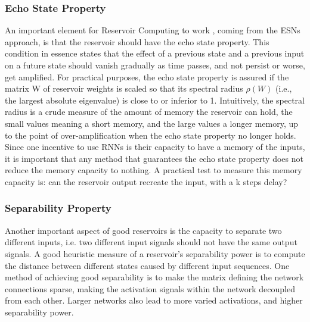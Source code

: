 \documentclass[12pt,oneside]{CUNY_CS_PhD}
\begin{document}
\subsubsection{Echo State Property}
An important element for Reservoir Computing to work , coming from the ESNs approach, is that the reservoir should have the echo state property. This condition in essence states that the effect of a previous state and a previous input on a future state should vanish gradually as time passes, and not persist or worse, get amplified. For practical purposes, the echo state property is assured if the matrix W of reservoir weights is scaled so that its spectral radius $\rho(W)$ (i.e., the largest absolute eigenvalue) is close to or inferior to 1. Intuitively, the spectral radius is a crude measure of the amount of memory the reservoir can hold, the small values meaning a short memory, and the large values a longer memory, up to the point of over-amplification when the echo state property no longer holds. Since one incentive to use RNNs is their capacity to have a memory of the inputs, it is important that any method that guarantees the echo state property does not reduce the memory capacity to nothing. A practical test to measure this memory capacity is: can the reservoir output recreate the input, with a k steps delay? 

\subsubsection{Separability Property}
Another important aspect of good reservoirs is the capacity to separate two different inputs, i.e. two different input signals should not have the same output signals. A good heuristic measure of a reservoir's separability power is to compute the distance between different states caused by different input sequences. One method of achieving good separability is to make the matrix defining the network connections sparse, making the activation signals within the network decoupled from each other. Larger networks also lead to more varied activations, and higher separability power.
\end{document}
